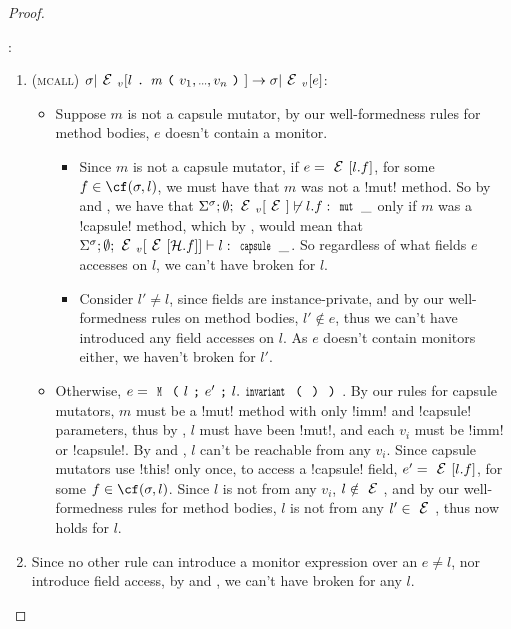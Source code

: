 \begin{proof}
\begin{ienumerate}
\item \NCM:
\begin{enumerate}
		\item (\textsc{mcall}) $\s|\EV[l\singleDot\m\oR v_1,\ldots,v_n\cR]\rightarrow \s|\EV[e]$:
		\begin{itemize}
			\item Suppose $m$ is not a capsule mutator, by our well-formedness rules for method bodies, $e$ doesn't contain a monitor.
			\begin{itemize}
			\item Since $m$ is not a capsule mutator, if $e = \E[l.f]$, for some $f \in \cf(\s, l)$, we must have that $m$ was not a \Q!mut! method. So by  and , we have that $\Ss; \emptyset; \EV[\E] \nvdash l.f : \Kw{mut}\,\_$ only if $m$ was a \Q!capsule! method, which by , would mean that $\Ss; \emptyset; \EV[\E[\h.f]] \vdash l : \Kw{capsule}\,\_$. So regardless of what fields $e$ accesses on $l$, we can't have broken \NCM for $l$.
			\item Consider $l' \neq l$, since fields are instance-private, and by our well-formedness rules on method bodies, $l' \notin e$, thus we can't have introduced any field accesses on $l$. As $e$ doesn't contain monitors either, we haven't broken \NCM for $l'$.
		\end{itemize}
		\item Otherwise, $e = \M{l}{e'}{l.\invariant}$. By our rules for capsule mutators, $m$ must be a \Q!mut! method with only \Q!imm! and \Q!capsule! parameters, thus by , $l$ must have been \Q!mut!, and each $v_i$ must be \Q!imm! or \Q!capsule!. By  and , $l$ can't be reachable from any $v_i$. Since capsule mutators use \Q!this! only once, to access a \Q!capsule! field, $e' = \E[l.f]$, for some $f \in \cf(\s, l)$. Since $l$ is not \reach from any $v_i$, $l \notin \E$, and by our well-formedness rules for method bodies, $l$ is not \reach from any $l' \in \E$, thus \HNO now holds for $l$.
		\end{itemize}	
		\item Since no other rule can introduce a monitor expression over an $e \neq l$, nor introduce field access, by  and , we can't have broken \NCM for any $l$.
\end{enumerate}


\end{ienumerate}
\end{proof}
